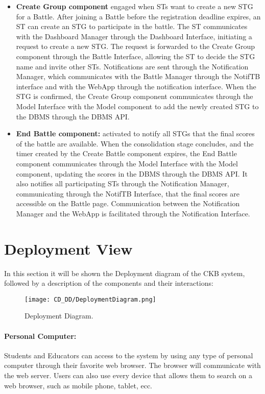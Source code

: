 \begin{itemize}
    \item \textbf{Create Group component} engaged when STs want to create a new STG for a Battle. After joining a Battle before the registration deadline expires, an ST can create an STG to participate in the battle. The ST communicates with the Dashboard Manager through the Dashboard Interface, initiating a request to create a new STG. The request is forwarded to the Create Group component through the Battle Interface, allowing the ST to decide the STG name and invite other STs. Notifications are sent through the Notification Manager, which communicates with the Battle Manager through the NotifTB interface and with the WebApp through the notification interface. When the STG is confirmed, the Create Group component communicates through the Model Interface with the Model component to add the newly created STG to the DBMS through the DBMS API.
    \item \textbf{End Battle component:} activated to notify all STGs that the final scores of the battle are available. When the consolidation stage concludes, and the timer created by the Create Battle component expires, the End Battle component communicates through the Model Interface with the Model component, updating the scores in the DBMS through the DBMS API. It also notifies all participating STs through the Notification Manager, communicating through the NotifTB Interface, that the final scores are accessible on the Battle page. Communication between the Notification Manager and the WebApp is facilitated through the Notification Interface.
\end{itemize}


\section{Deployment View}
\label{sec:deployment_view}%

In this section it will be shown the Deployment diagram of the CKB system, followed by a description of the components and their interactions:
\begin{figure}[H]
    \begin{center}
        \texttt{[image: CD\_DD/DeploymentDiagram.png]}
        \caption{Deployment Diagram.}
        \label{fig:Deployment_Diagram}%
    \end{center}
\end{figure}

\paragraph{Personal Computer: }
Students and Educators can access to the system by using any type of personal computer through their favorite web browser. The browser will communicate with the web server. Users can also use every device that allows them to search on a web browser, such as mobile phone, tablet, ecc.

